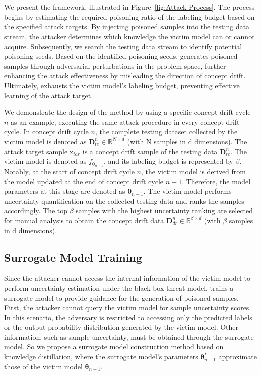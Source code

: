 \section{\pandora}
\label{Sec: Attack Method}

We present the \pandora framework, illustrated in Figure~\ref{fig:Attack Process}.
The process begins by estimating the required poisoning ratio of the labeling budget based on the specified attack targets.
By injecting poisoned samples into the testing data stream, the attacker determines which knowledge the victim model can or cannot acquire.
Subsequently, we search the testing data stream to identify potential poisoning seeds.
Based on the identified poisoning seeds, \pandora generates poisoned samples through adversarial perturbations in the problem space, further enhancing the attack effectiveness by misleading the direction of concept drift.
Ultimately, \pandora exhausts the victim model’s labeling budget, preventing effective learning of the attack target.

We demonstrate the design of the \pandora method by using a specific concept drift cycle $n$ as an example, executing the same attack procedure in every concept drift cycle.
In concept drift cycle $n$, the complete testing dataset collected by the victim model is denoted as $\bm{D}_{te}^{n} \in \mathbb{R}^{N \times d}$ (with N samples in d dimensions).
The attack target sample $\bm{\mathrm{x}}_{tar}$ is a concept drift sample of the testing data $\bm{D}_{te}^{n}$. 
The victim model is denoted as $f_{\bm{\theta}_{n-1}}$, and its labeling budget is represented by $\beta$.
Notably, at the start of concept drift cycle $n$, the victim model is derived from the model updated at the end of concept drift cycle $n-1$. Therefore, the model parameters at this stage are denoted as $\bm{\theta}_{n-1}$.
The victim model performs uncertainty quantification on the collected testing data and ranks the samples accordingly.
The top $\beta$ samples with the highest uncertainty ranking are selected for manual analysis to obtain the concept drift data $\bm{D}_{dr}^{n} \in \mathbb{R}^{\beta \times d}$ (with $\beta$ samples in d dimensions).

\subsection{Surrogate Model Training}
Since the attacker cannot access the internal information of the victim model to perform uncertainty estimation under the black-box threat model, \pandora trains a surrogate model to provide guidance for the generation of poisoned samples.
First, the attacker cannot query the victim model for sample uncertainty scores. 
In this scenario, the adversary is restricted to accessing only the predicted labels or the output probability distribution generated by the victim model.
Other information, such as sample uncertainty, must be obtained through the surrogate model.
So we propose a surrogate model construction method based on knowledge distillation, where the surrogate model’s parameters $\bm{\theta}_{n-1}^{*}$ approximate those of the victim model $\bm{\theta}_{n-1}$.

